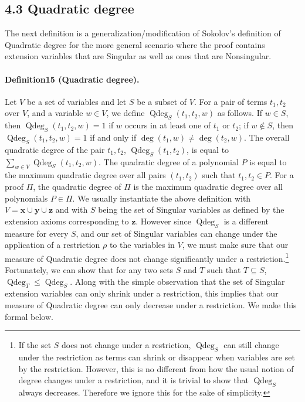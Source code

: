 \documentclass[10pt,a4paper]{article}
\DeclareMathOperator{\Qdeg}{Qdeg}
\begin{document}
\subsection*{4.3 Quadratic degree}
The next definition is a generalization/modification of Sokolov's definition of Quadratic degree for the more general scenario where the proof contains extension variables that are Singular as well as ones that are Nonsingular.
\paragraph{Definition15 (Quadratic degree).}
Let $V$ be a set of variables and let $S$ be a subset of $V$. For a pair of terms $t_1,t_2$ over $V$, and a variable $w\in V$, we define $\Qdeg_S(t_1,t_2,w)$ as follows. If $w\in S$, then $\Qdeg_S(t_1,t_2,w)=1$ if $w$ occurs in at least one of $t_1$ or $t_2$; if $w\notin S$, then $\Qdeg_S(t_1,t_2,w)=1$ if and only if $\deg(t_1,w)\neq\deg(t_2,w)$. The overall quadratic degree of the pair $t_1,t_2$, $\Qdeg_S(t_1,t_2)$, is equal to $\sum_{w\in V}\Qdeg_S(t_1,t_2,w)$. The quadratic degree of a polynomial $P$ is equal to the maximum quadratic degree over all pairs $(t_1,t_2)$ such that $t_1,t_2\in P$. For a proof $\Pi$, the quadratic degree of $\Pi$ is the maximum quadratic degree over all polynomials $P\in\Pi$.
We usually instantiate the above definition with $V=\mathbf x\cup\mathbf y\cup\mathbf z$ and with $S$ being the set of Singular variables as defined by the extension axioms corresponding to $\mathbf z$. However since $\Qdeg_S$ is a different measure for every $S$, and our set of Singular variables can change under the application of a restriction $\rho$ to the variables in $V$, we must make sure that our measure of Quadratic degree does not change significantly under a restriction.\footnote{If the set $S$ does not change under a restriction, $\Qdeg_S$ can still change under the restriction as terms can shrink or disappear when variables are set by the restriction. However, this is no different from how the usual notion of degree changes under a restriction, and it is trivial to show that $\Qdeg_S$ always decreases. Therefore we ignore this for the sake of simplicity.} Fortunately, we can show that for any two sets $S$ and $T$ such that $T\subseteq S$, $\Qdeg_T\leq\Qdeg_S$. Along with the simple observation that the set of Singular extension variables can only shrink under a restriction, this implies that our measure of Quadratic degree can only decrease under a restriction. We make this formal below.
\end{document}
